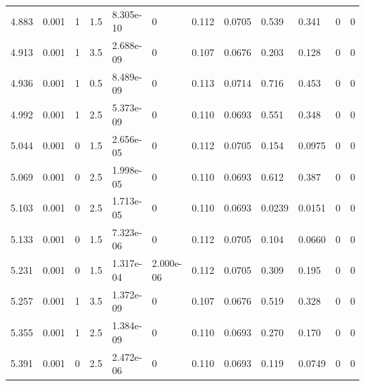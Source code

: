 \documentclass[preview]{standalone}
\begin{document}
{{{\begin{tabular}{L{1.2cm}C{1.2cm} C{0.3cm}C{0.5cm} C{1.4cm}C{1.4cm} C{1.4cm}C{1.4cm} C{1.6cm}C{1.6cm} C{1.6cm}C{1.6cm}}
  4.883  &  0.001  & 1     & 1.5 &  8.305e-10  & 0  &  0.112&   0.0705& 0.539 & 0.341   &  0 & 0  \\ 
  4.913  &  0.001  & 1     & 3.5 &  2.688e-09  & 0  &  0.107&   0.0676& 0.203 & 0.128   &  0 & 0  \\ 
  4.936  &  0.001  & 1     & 0.5 &  8.489e-09  & 0  &  0.113&   0.0714& 0.716 & 0.453   &  0 & 0  \\ 
  4.992  &  0.001  & 1     & 2.5 &  5.373e-09  & 0  &  0.110&   0.0693& 0.551 & 0.348   &  0 & 0  \\ 
  5.044  &  0.001  & 0     & 1.5 &  2.656e-05  & 0  &  0.112&   0.0705& 0.154 & 0.0975   &  0 & 0  \\ 
  5.069  &  0.001  & 0     & 2.5 &  1.998e-05  & 0  &  0.110&   0.0693& 0.612 & 0.387   &  0 & 0  \\ 
  5.103  &  0.001  & 0     & 2.5 &  1.713e-05  & 0  &  0.110&   0.0693& 0.0239 & 0.0151   &  0 & 0  \\ 
  5.133  &  0.001  & 0     & 1.5 &  7.323e-06  & 0  &  0.112&   0.0705& 0.104 & 0.0660   &  0 & 0  \\ 
  5.231  &  0.001  & 0     & 1.5 &  1.317e-04  & 2.000e-06  &  0.112&   0.0705& 0.309 & 0.195   &  0 & 0  \\ 
  5.257  &  0.001  & 1     & 3.5 &  1.372e-09  & 0  &  0.107&   0.0676& 0.519 & 0.328   &  0 & 0  \\ 
  5.355  &  0.001  & 1     & 2.5 &  1.384e-09  & 0  &  0.110&   0.0693& 0.270 & 0.170   &  0 & 0  \\ 
  5.391  &  0.001  & 0     & 2.5 &  2.472e-06  & 0  &  0.110&   0.0693& 0.119 & 0.0749   &  0 & 0  \\ 
\hline 
\end{tabular} 

}}}
\end{document}
